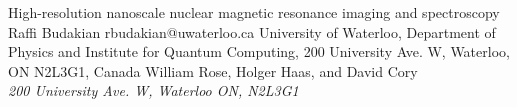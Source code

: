 \begin{conf-abstract}[]
{High-resolution nanoscale nuclear magnetic resonance imaging and spectroscopy}
{\color{blue} Raffi Budakian}
{rbudakian@uwaterloo.ca}
{University of Waterloo, Department of Physics and Institute for Quantum Computing, 200 University Ave. W, Waterloo, ON N2L3G1, Canada}
{{\color{blue}William Rose, Holger Haas, and David Cory}\\ \textit{200 University Ave. W, Waterloo ON, N2L3G1}\\ 
\decofourleft \decofourright}





\printbibliography[heading=none]

\end{conf-abstract}
